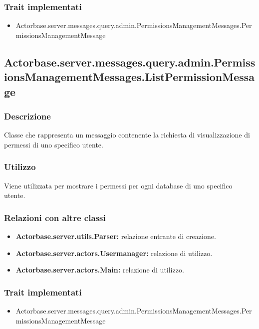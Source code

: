 \documentclass[a4paper]{article}
\begin{document}
			\subsubsection{Trait implementati}
				\begin{itemize}
					\item Actorbase.server.messages.query.admin.PermissionsManagementMessages.PermissionsManagementMessage
				\end{itemize}
				
		\subsection{Actorbase.server.messages.query.admin.PermissionsManagementMessages.ListPermissionMessage}
			\subsubsection{Descrizione}
				Classe che rappresenta un messaggio contenente la richiesta di visualizzazione di permessi di uno specifico utente.
				
			\subsubsection{Utilizzo}
				Viene utilizzata per mostrare i  permessi per ogni database di uno specifico utente.
				
			\subsubsection{Relazioni con altre classi}
				\begin{itemize}
					\item \textbf{Actorbase.server.utils.Parser:} relazione entrante di creazione.
					\item \textbf{Actorbase.server.actors.Usermanager:} relazione di utilizzo.
					\item \textbf{Actorbase.server.actors.Main:} relazione di utilizzo.
				\end{itemize}
			\subsubsection{Trait implementati}
				\begin{itemize}
					\item Actorbase.server.messages.query.admin.PermissionsManagementMessages.PermissionsManagementMessage
				\end{itemize}
				
\end{document}

